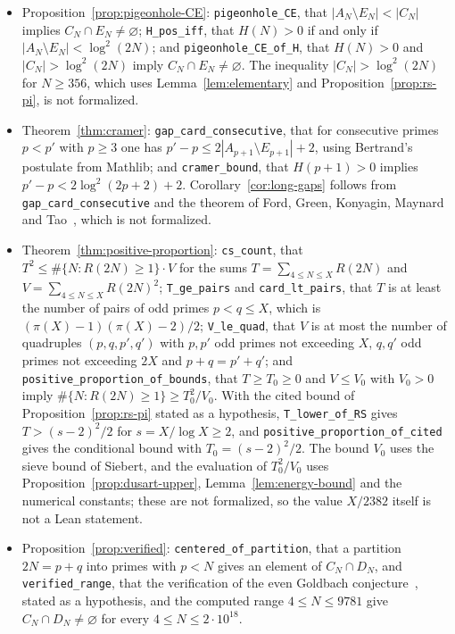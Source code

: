 \documentclass[11pt]{amsart}
\theoremstyle{definition}
\theoremstyle{remark}
\begin{document}
\begin{itemize}
\item Proposition~\ref{prop:pigeonhole-CE}: \texttt{pigeonhole\_CE}, that $|A_N\setminus E_N|<|C_N|$ implies $C_N\cap E_N\neq\varnothing$; \texttt{H\_pos\_iff}, that $H(N)>0$ if and only if $|A_N\setminus E_N|<\log^2(2N)$; and \texttt{pigeonhole\_CE\_of\_H}, that $H(N)>0$ and $|C_N|>\log^2(2N)$ imply $C_N\cap E_N\neq\varnothing$. The inequality $|C_N|>\log^2(2N)$ for $N\geq 356$, which uses Lemma~\ref{lem:elementary} and Proposition~\ref{prop:rs-pi}, is not formalized.
\item Theorem~\ref{thm:cramer}: \texttt{gap\_card\_consecutive}, that for consecutive primes $p<p'$ with $p\geq 3$ one has $p'-p\leq 2|A_{p+1}\setminus E_{p+1}|+2$, using Bertrand's postulate from Mathlib; and \texttt{cramer\_bound}, that $H(p+1)>0$ implies $p'-p<2\log^2(2p+2)+2$. Corollary~\ref{cor:long-gaps} follows from \texttt{gap\_card\_consecutive} and the theorem of Ford, Green, Konyagin, Maynard and Tao~\cite{ford2018long}, which is not formalized.
\item Theorem~\ref{thm:positive-proportion}: \texttt{cs\_count}, that $T^2\leq \#\{N: R(2N)\geq 1\}\cdot V$ for the sums $T=\sum_{4\leq N\leq X}R(2N)$ and $V=\sum_{4\leq N\leq X}R(2N)^2$; \texttt{T\_ge\_pairs} and \texttt{card\_lt\_pairs}, that $T$ is at least the number of pairs of odd primes $p<q\leq X$, which is $(\pi(X)-1)(\pi(X)-2)/2$; \texttt{V\_le\_quad}, that $V$ is at most the number of quadruples $(p,q,p',q')$ with $p,p'$ odd primes not exceeding $X$, $q,q'$ odd primes not exceeding $2X$ and $p+q=p'+q'$; and \texttt{positive\_proportion\_of\_bounds}, that $T\geq T_0\geq 0$ and $V\leq V_0$ with $V_0>0$ imply $\#\{N: R(2N)\geq 1\}\geq T_0^2/V_0$. With the cited bound of Proposition~\ref{prop:rs-pi} stated as a hypothesis, \texttt{T\_lower\_of\_RS} gives $T>(s-2)^2/2$ for $s=X/\log X\geq 2$, and \texttt{positive\_proportion\_of\_cited} gives the conditional bound with $T_0=(s-2)^2/2$. The bound $V_0$ uses the sieve bound of Siebert, and the evaluation of $T_0^2/V_0$ uses Proposition~\ref{prop:dusart-upper}, Lemma~\ref{lem:energy-bound} and the numerical constants; these are not formalized, so the value $X/2382$ itself is not a Lean statement.
\item Proposition~\ref{prop:verified}: \texttt{centered\_of\_partition}, that a partition $2N=p+q$ into primes with $p<N$ gives an element of $C_N\cap D_N$, and \texttt{verified\_range}, that the verification of the even Goldbach conjecture~\cite{oliveira2014empirical}, stated as a hypothesis, and the computed range $4\leq N\leq 9781$ give $C_N\cap D_N\neq\varnothing$ for every $4\leq N\leq 2\cdot 10^{18}$.

\end{itemize}
\end{document}
